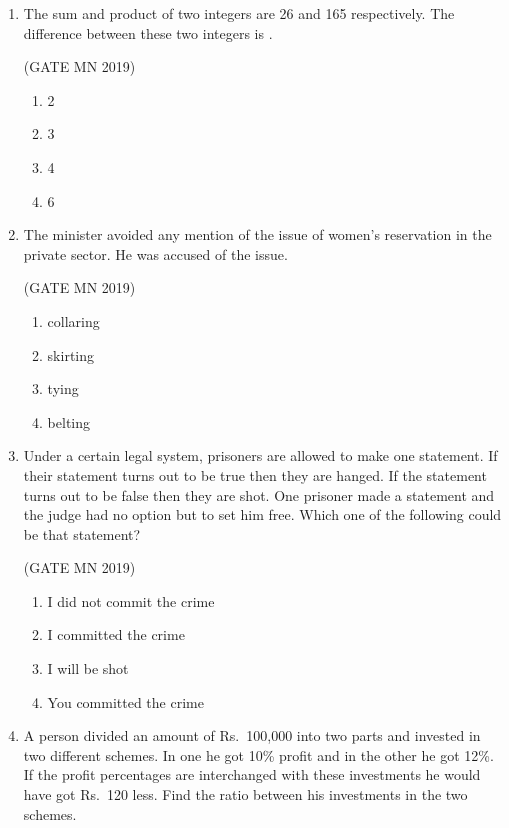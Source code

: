 \documentclass[journal]{IEEEtran}
\begin{document}
\begin{enumerate}
\item The sum and product of two integers are 26 and 165 respectively. The difference between these two integers is  \underline{\hspace{2cm}}.

	\hfill(GATE MN 2019)
\begin{multicols}{4}
\begin{enumerate}
\item 2  
\item 3  
\item 4  
\item 6  
\end{enumerate}
\end{multicols}


\item The minister avoided any mention of the issue of women’s reservation in the private sector. He was accused of  \underline{\hspace{2cm}} the issue.

	\hfill(GATE MN 2019)
\begin{multicols}{4}
\begin{enumerate}
\item collaring  
\item skirting  
\item tying  
\item belting  
\end{enumerate}
\end{multicols}

\item Under a certain legal system, prisoners are allowed to make one statement. If their statement turns out to be true then they are hanged. If the statement turns out to be false then they are shot. One prisoner made a statement and the judge had no option but to set him free. Which one of the following could be that statement?


	\hfill(GATE MN 2019)
\begin{enumerate}
\item I did not commit the crime  
\item I committed the crime  
\item I will be shot  
\item You committed the crime  
\end{enumerate}


\item A person divided an amount of Rs.\ 100,000 into two parts and invested in two different schemes. In one he got 10\% profit and in the other he got 12\%. If the profit percentages are interchanged with these investments he would have got Rs.\ 120 less. Find the ratio between his investments in the two schemes.


\end{enumerate}
\end{document}
